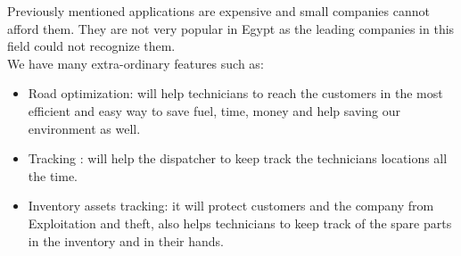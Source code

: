 Previously mentioned applications are expensive and small companies cannot afford them. They are not very popular in Egypt as the leading companies in this field could not recognize them.\\
We have many extra-ordinary features such as: 
\begin{itemize}
	\item Road optimization: will help technicians to reach the customers in the most efficient and easy way to save fuel, time, money and help saving our environment as well.
	\item Tracking : will help the dispatcher to keep track the technicians locations all the time.
	\item Inventory assets tracking: it will protect customers and the company from Exploitation and theft, also helps technicians to keep track of the spare parts in the inventory and in their hands.
\end{itemize}


